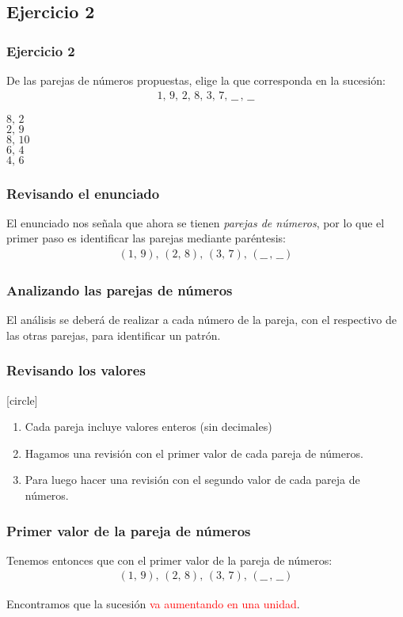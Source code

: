 \subsection{Ejercicio 2}
\begin{frame}
\frametitle{Ejercicio 2}
De las parejas de números propuestas, elige la que corresponda en la sucesión:
\begin{align*}
1, \, 9, \, 2, \, 8, \, 3, \, 7, \, \_\_ \, , \, \_\_
\end{align*}
\begin{choices}
\choice $8, \, 2$ \\
\choice $2, \, 9$ \\
\choice $8, \, 10$ \\
\choice $6, \, 4$ \\
\choice $4, \, 6$ \\
\end{choices}
\end{frame}
\begin{frame}
\frametitle{Revisando el enunciado}
El enunciado nos señala que ahora se tienen \emph{parejas de números}, por lo que el primer paso es identificar las parejas mediante paréntesis:
\pause
\begin{align*}
(1, \, 9), \, (2, \, 8), \, (3, \, 7), \, (\_\_ \, , \, \_\_)
\end{align*}
\end{frame}
\begin{frame}
\frametitle{Analizando las parejas de números}
El análisis se deberá de realizar a cada número de la pareja, con el respectivo de las otras parejas, para identificar un patrón.
\end{frame}
\begin{frame}
\frametitle{Revisando los valores}
[circle]
\begin{enumerate}[<+->]
\item Cada pareja incluye valores enteros (sin decimales)
\item Hagamos una revisión con el primer valor de cada pareja de números.
\item Para luego hacer una revisión con el segundo valor de cada pareja de números.
\end{enumerate}
\end{frame}
\begin{frame}
\frametitle{Primer valor de la pareja de números}
Tenemos entonces que con el primer valor de la pareja de números:
\begin{align*}
(1, \, 9), \, (2, \, 8), \, (3, \, 7), \, (\_\_ \, , \, \_\_)
\end{align*}
\pause
Encontramos que la sucesión \textcolor{red}{va aumentando en una unidad}.
\end{frame}
